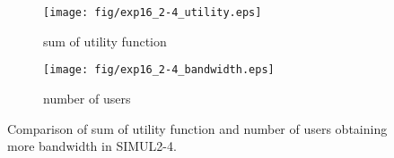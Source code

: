 \begin{figure}
	\begin{center}
		\begin{subfigure}[b]{0.8\textwidth}
			\centering
			\texttt{[image: fig/exp16\_2-4\_utility.eps]}
			\caption{sum of utility function}
			\label{figure:simul2_4_u_a}
		\end{subfigure}
		\begin{subfigure}[b]{0.8\textwidth}
			\centering
			\texttt{[image: fig/exp16\_2-4\_bandwidth.eps]}
			\caption{number of users}
			\label{figure:simul2_4_u_b}
		\end{subfigure}
		\caption{Comparison of sum of utility function and number of users obtaining more bandwidth in SIMUL2-4.}
		\label{figure:simul2_4_u}
	\end{center}
\end{figure}

\clearpage



